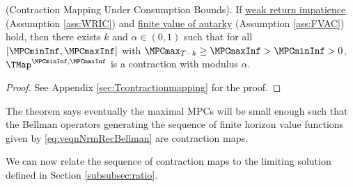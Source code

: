 \documentclass[\econtexRoot/BufferStockTheory]{subfiles}
\begin{document}
\begin{theorem}(Contraction Mapping Under Consumption Bounds).
\label{thm:cmap}\label{subsec:contraction}%
If \hyperlink{WRIC}{weak return impatience} (Assumption \ref{ass:WRIC})  and  \hyperlink{FVAC}{finite value of autarky} (Assumption \ref{ass:FVAC}) hold, then there exists $k$ and $\alpha\in (0,1)$ such that for all $[\MPCminInf, \MPCmaxInf]$ with $\MPCmax_{T-k}\geq \MPCmaxInf> \MPCminInf>0$, $\TMap^{\MPCminInf, \MPCmaxInf}$ is a contraction with modulus $\alpha$.
\end{theorem}
\begin{proof}
See Appendix \ref{sec:Tcontractionmapping} for the proof.

\end{proof}

The theorem says eventually the maximal MPCs will be small enough such that the Bellman operators generating the sequence of finite horizon value functions given by \eqref{eq:veqnNrmRecBellman} are contraction maps.

We can now relate the sequence of contraction maps to the limiting solution defined in Section \ref{subsubsec:ratio}.
\end{document}
